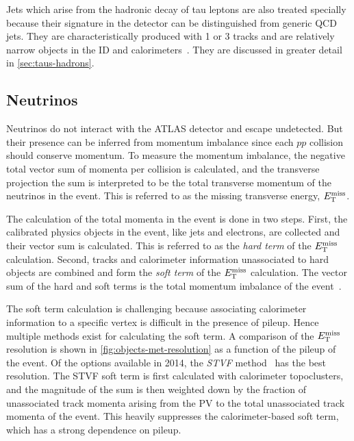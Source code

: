 Jets which arise from the hadronic decay of tau leptons are also treated specially because their signature in the detector can be distinguished from generic QCD jets. They are characteristically produced with 1 or 3 tracks and are relatively narrow objects in the ID and calorimeters~\cite{PERF-2013-06}. They are discussed in greater detail in \cref{sec:taus-hadrons}.

\subsection{Neutrinos}

Neutrinos do not interact with the ATLAS detector and escape undetected. But their presence can be inferred from momentum imbalance since each $pp$ collision should conserve momentum. To measure the momentum imbalance, the negative total vector sum of momenta per collision is calculated, and the transverse projection the sum is interpreted to be the total transverse momentum of the neutrinos in the event. This is referred to as the missing transverse energy, $E_{\mathrm{T}}^{\mathrm{miss}}$.

The calculation of the total momenta in the event is done in two steps. First, the calibrated physics objects in the event, like jets and electrons, are collected and their vector sum is calculated. This is referred to as the \textit{hard term} of the $E_{\mathrm{T}}^{\mathrm{miss}}$ calculation. Second, tracks and calorimeter information unassociated to hard objects are combined and form the \textit{soft term} of the $E_{\mathrm{T}}^{\mathrm{miss}}$ calculation. The vector sum of the hard and soft terms is the total momentum imbalance of the event~\cite{PERF-2011-07}.

The soft term calculation is challenging because associating calorimeter information to a specific vertex is difficult in the presence of pileup. Hence multiple methods exist for calculating the soft term. A comparison of the $E_{\mathrm{T}}^{\mathrm{miss}}$ resolution is shown in \cref{fig:objects-met-resolution} as a function of the pileup of the event. Of the options available in 2014, the \textit{STVF} method~\cite{ATLAS-CONF-2014-019} has the best resolution. The STVF soft term is first calculated with calorimeter topoclusters, and the magnitude of the sum is then weighted down by the fraction of unassociated track momenta arising from the PV to the total unassociated track momenta of the event. This heavily suppresses the calorimeter-based soft term, which has a strong dependence on pileup.

